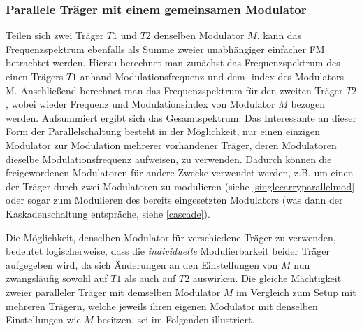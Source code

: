 \subsubsection{Parallele Träger mit einem gemeinsamen Modulator}

Teilen sich zwei Träger $T1$ und $T2$ denselben Modulator $M$, kann das Frequenzspektrum ebenfalls als Summe zweier unabhängiger einfacher FM betrachtet werden. Hierzu berechnet man zunächst das Frequenzspektrum des einen Trägers $T1$ anhand Modulationsfrequenz und dem -index des Modulators M. Anschließend berechnet man das Frequenzspektrum für den zweiten Träger $T2$, wobei wieder Frequenz und Modulationsindex von Modulator $M$ bezogen werden. Aufsummiert ergibt sich das Gesamtspektrum. Das Interessante an dieser Form der Parallelschaltung besteht in der Möglichkeit, nur einen einzigen Modulator zur Modulation mehrerer vorhandener Träger, deren Modulatoren dieselbe Modulationsfrequenz aufweisen, zu verwenden. Dadurch können die freigewordenen Modulatoren für andere Zwecke verwendet werden, z.B. um einen der Träger durch zwei Modulatoren zu modulieren (siehe \ref{singlecarryparallelmod} oder sogar zum Modulieren des bereits eingesetzten Modulators (was dann der Kaskadenschaltung entspräche, siehe \ref{cascade}).  

Die Möglichkeit, denselben Modulator für verschiedene Träger zu verwenden, bedeutet logischerweise, dass die \textit{individuelle} Modulierbarkeit beider Träger aufgegeben wird, da sich Änderungen an den Einstellungen von $M$ nun zwangsläufig sowohl auf $T1$ als auch auf $T2$ auswirken. Die gleiche Mächtigkeit zweier paralleler Träger mit demselben Modulator $M$ im Vergleich zum Setup mit mehreren Trägern, welche jeweils ihren eigenen Modulator mit denselben Einstellungen wie $M$ besitzen, sei im Folgenden illustriert. 

